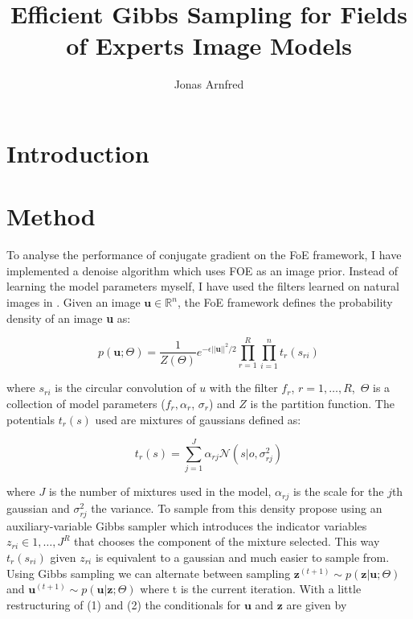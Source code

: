 \documentclass{article}
\begin{document}
\title{Efficient Gibbs Sampling for Fields of Experts Image Models}

\author{Jonas Arnfred}

\maketitle

\section{Introduction}

\section{Method}



To analyse the performance of conjugate gradient on the FoE framework, I 
have implemented a denoise algorithm which uses FOE as an image prior.  
Instead of learning the model parameters myself, I have used the filters 
learned on natural images in \citep{uwe}. Given an image $\textbf{u} \in 
\mathbb{R}^n$, the FoE framework defines the probability density of an 
image \textbf{u} as:

\begin{equation}
	p(\textbf{u}; \Theta) = 
	\frac{1}{Z(\Theta)}e^{-\epsilon||\textbf{u}||^2/2} \prod_{r=1}^{R} 
	\prod_{i=1}^{n} t_r(s_{ri})
\end{equation}

where $s_{ri}$ is the circular convolution of $u$ with the filter $f_r$, 
$r = 1, \ldots , R$, $\,\Theta$ is a collection of model parameters 
($f_r, \alpha_r$, $\sigma_r$) and $Z$ is the partition function.  The 
potentials $t_r(s)$ used are mixtures of gaussians defined as:

\begin{equation}
	t_r(s) = \sum_{j=1}^{J} \alpha_{rj}\mathcal{N}(s|o, \sigma^2_{rj})
\end{equation}

where $J$ is the number of mixtures used in the model, $\alpha_{rj}$ is 
the scale for the $j$th gaussian and $\sigma^2_{rj}$ the variance. To 
sample from this density \citep{uwe} propose using an auxiliary-variable 
Gibbs sampler which introduces the indicator variables $z_{ri} \in {1, 
\ldots, J}^R$ that chooses the component of the mixture selected.  This 
way $t_r(s_{ri})$ given $z_{ri}$ is equivalent to a gaussian and much 
easier to sample from. Using Gibbs sampling we can alternate between 
sampling $\textbf{z}^{(t + 1)} \sim p(\textbf{z}|\textbf{u};\Theta)$ and 
$\textbf{u}^{(t + 1)} \sim p(\textbf{u}|\textbf{z};\Theta)$ where t is 
the current iteration.  With a little restructuring of (1) and (2) the 
conditionals for $\textbf{u}$
and $\textbf{z}$ are given by
\end{document}
